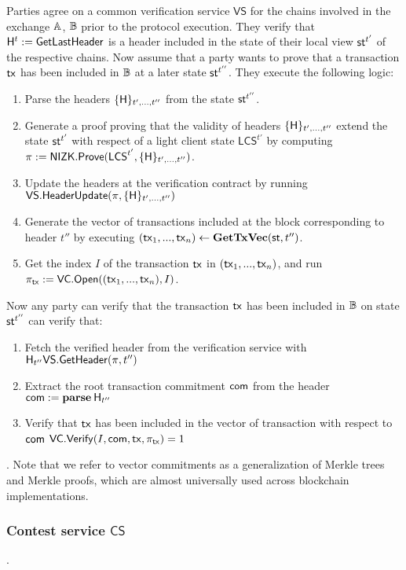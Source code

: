 Parties agree on a common verification service $\mathsf{VS}$ for the chains involved in the exchange $\mathbb{A}$, $\mathbb{B}$ prior to the protocol execution. They verify that $\mathsf{H}^t := \mathsf{GetLastHeader}$ is a header included in the state of their local view $\st^{t'}$ of the respective chains.
Now assume that a party wants to prove that a transaction $\mathsf{tx}$ has been included in $\mathbb{B}$ at a later state $\st^{t''}$. They execute the following logic:
\begin{enumerate}
	\item Parse the headers $\{ \mathsf{H} \}_{t',...,t''}$ from the state $\st^{t''}$.
	\item Generate a proof proving that the validity of headers $\{ \mathsf{H} \}_{t',...,t''}$ extend the state $\st^{t'}$ with respect of a light client state $\mathsf{LCS}^{t'}$ by computing $\pi:= \mathsf{NIZK}.\mathsf{Prove}(\mathsf{LCS}^{t'}, \{ \mathsf{H} \}_{t',...,t''})$.
	\item Update the headers at the verification contract by running $\mathsf{VS}.\mathsf{HeaderUpdate}(\pi, \{ \mathsf{H} \}_{t',...,t''})$
	\item Generate the vector of transactions included at the block corresponding to header $t''$ by executing $(\tx_1, ..., \tx_n) \gets \textbf{GetTxVec}(\st, t'')$.
	\item Get the index $I$ of the transaction $\mathsf{tx}$ in $(\mathsf{tx}_1, ..., \mathsf{tx}_n)$, and run $\pi_{\mathsf{tx}} := \mathsf{VC}.\mathsf{Open}((\mathsf{tx}_1, ..., \mathsf{tx}_n), I)$.
\end{enumerate}
Now any party can verify that the transaction $\mathsf{tx}$ has been included in $\mathbb{B}$ on state $\st^{t''}$ can verify that:
\begin{enumerate}
	\item Fetch the verified header from the verification service with $\mathsf{H}_{t''} \mathsf{VS}.\mathsf{GetHeader}(\pi, t'')$
	\item Extract the root transaction commitment $\mathsf{com}$ from the header $\mathsf{com} := \mathbf{parse} \: \mathsf{H}_{t''}$
	\item Verify that $\mathsf{tx}$ has been included in the vector of transaction with respect to $\mathsf{com}$  $\mathsf{VC}.\mathsf{Verify}(I, \mathsf{com}, \mathsf{tx}, \pi_{\mathsf{tx}}) = 1$
\end{enumerate}.
Note that we refer to vector commitments as a generalization of Merkle trees and Merkle proofs, which are almost universally used across blockchain implementations.

\subsubsection{Contest service $\mathsf{CS}$}.

